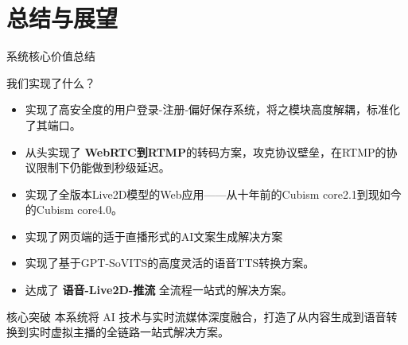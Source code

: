 \documentclass{beamer}
\begin{document}
	\section{总结与展望}
	\begin{frame}{系统核心价值总结}
		\begin{block}{我们实现了什么？}
			\begin{itemize}
				\item<1-> 实现了高安全度的用户登录-注册-偏好保存系统，将之模块高度解耦，标准化了其端口。
				\item<2-> 从头实现了 \textbf{WebRTC到RTMP}的转码方案，攻克协议壁垒，在RTMP的协议限制下仍能做到秒级延迟。
				\item<3-> 实现了全版本Live2D模型的Web应用——从十年前的Cubism core2.1到现如今的Cubism core4.0。
				\item<4-> 实现了网页端的适于直播形式的AI文案生成解决方案
				\item<5-> 实现了基于GPT-SoVITS的高度灵活的语音TTS转换方案。
				\item<6-> 达成了 \textbf{语音-Live2D-推流} 全流程一站式的解决方案。
			\end{itemize}
		\end{block}
		\begin{alertblock}{核心突破}
			本系统将 AI 技术与实时流媒体深度融合，打造了从内容生成到语音转换到实时虚拟主播的全链路一站式解决方案。
		\end{alertblock}
	\end{frame}
\end{document}
